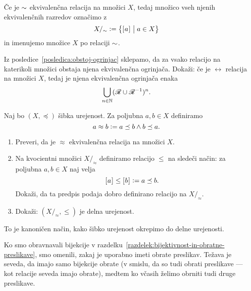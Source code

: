                 Če je $\sim$ ekvivalenčna relacija na množici $X$, tedaj množico vseh njenih ekvivalenčnih razredov označimo z
                \[X/_\equ \dfeq \set[1]{\ec{a}}{a \in X}\]
                in imenujemo  množice $X$ po relaciji $\sim$.


                \begin{naloga}
                        Iz posledice~\ref{posledica:obstoj-ogrinjac} sklepamo, da za vsako relacijo na katerikoli množici obstaja njena ekvivalenčna ogrinjača. Dokaži: če je $\rel$ relacija na množici $X$, tedaj je njena ekvivalenčna ogrinjača enaka
                        \[\bigcup_{n \in \NN} (\rel \cup \rel^{-1})^n.\]
                \end{naloga}

                \begin{naloga}
                        Naj bo $(X, \preceq)$ šibka urejenost. Za poljubna $a, b \in X$ definiramo
                        \[a \approx b \mathrel{\mathop:}= a \preceq b \land b \preceq a.\]
                        \begin{enumerate}
                                \item
                                        Preveri, da je $\approx$ ekvivalenčna relacija na množici $X$.
                                \item
                                        Na kvocientni množici $X/_\approx$ definiramo relacijo $\leq$ na sledeči način: za poljubna $a, b \in X$ naj velja
                                        \[[\:\!{a}\:\!]_{} \leq [\:\!{b}\:\!]_{} \mathrel{\mathop:}= a \preceq b.\]
                                        Dokaži, da ta predpis podaja dobro definirano relacijo na $X/_\approx$.
                                \item
                                        Dokaži: $(X/_\approx, \leq)$ je delna urejenost.
                        \end{enumerate}
                        To je kanoničen način, kako šibko urejenost okrepimo do delne urejenosti.
                \end{naloga}


                Ko smo obravnavali bijekcije v razdelku~\ref{razdelek:bijektivnost-in-obratne-preslikave}, smo omenili, zakaj je uporabno imeti obrate preslikav. Težava je seveda, da imajo samo bijekcije obrate (v smislu, da so tudi obrati preslikave --- kot relacije seveda imajo obrate), medtem ko včasih želimo obrniti tudi druge preslikave.

